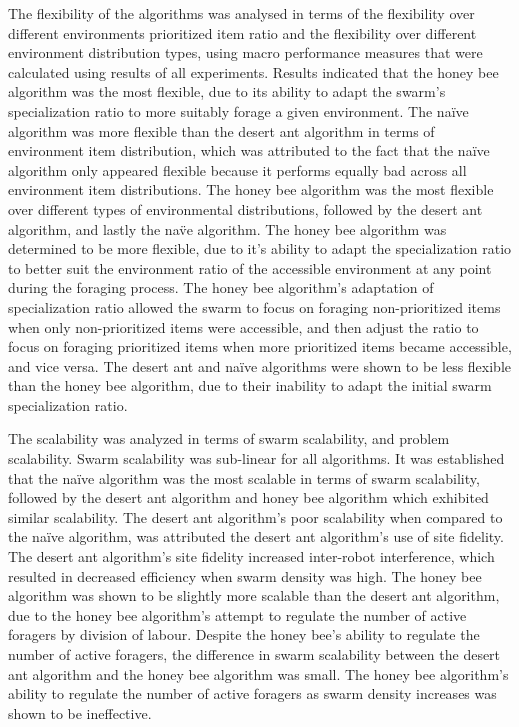 The flexibility of the algorithms was analysed in terms of the flexibility over different environments prioritized item ratio and the flexibility over different environment distribution types, using macro performance measures that were calculated using results of all experiments. Results indicated that the honey bee algorithm was the most flexible, due to its ability to adapt the swarm's specialization ratio to more suitably forage a given environment. The na\"ive algorithm was more flexible than the desert ant algorithm in terms of environment item distribution, which was attributed to the fact that the na\"ive algorithm only appeared flexible because it performs equally bad across all environment item distributions. The honey bee algorithm was the most flexible over different types of environmental distributions, followed by the desert ant algorithm, and lastly the na\"ve algorithm. The honey bee algorithm was determined to be more flexible, due to it's ability to adapt the specialization ratio to better suit the environment ratio of the accessible environment at any point during the foraging process. The honey bee algorithm's adaptation of specialization ratio allowed the swarm to focus on foraging non-prioritized items when only non-prioritized items were accessible, and then adjust the ratio to focus on foraging prioritized items when more prioritized items became accessible, and vice versa. The desert ant and na\"ive algorithms were shown to be less flexible than the honey bee algorithm, due to their inability to adapt the initial swarm specialization ratio.

The scalability was analyzed in terms of swarm scalability, and problem scalability. Swarm scalability was sub-linear for all algorithms. It was established that the na\"ive algorithm was the most scalable in terms of swarm scalability, followed by the desert ant algorithm and honey bee algorithm which exhibited similar scalability. The desert ant algorithm's poor scalability when compared to the na\"ive algorithm, was attributed the desert ant algorithm's use of site fidelity. The desert ant algorithm's site fidelity increased inter-robot interference, which resulted in decreased efficiency when swarm density was high. The honey bee algorithm was shown to be slightly more scalable than the desert ant algorithm, due to the honey bee algorithm's attempt to regulate the number of active foragers by division of labour. Despite the honey bee's ability to regulate the number of active foragers, the difference in swarm scalability between the desert ant algorithm and the honey bee algorithm was small. The honey bee algorithm's ability to regulate the number of active foragers as swarm density increases was shown to be ineffective. 

